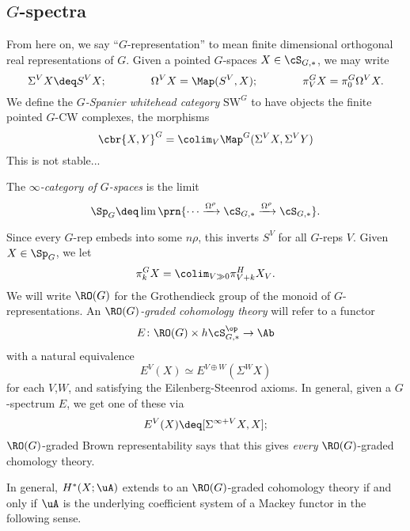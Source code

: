 \subsection{\texorpdfstring{$G$}{G}-spectra}%
\def\SW{\mathrm{SW}}
From here on, we say ``$G$-representation'' to mean finite dimensional orthogonal real representations of $G$.
Given a pointed $G$-spaces $X \in \cS_{G,*}$, we may write
\[
  \Sigma^V X \deq S^V X; \hspace{40pt} \Omega^V X = \Map(S^V,X); \hspace{40pt} \pi_V^G X = \pi_0^G \Omega^V X.
\]
We define the \emph{$G$-Spanier whitehead category} $\SW^G$ to have objects the finite pointed $G$-CW complexes, the morphisms
\[
  \cbr{X,Y}^G = \colim_V \Map^G(\Sigma^V X, \Sigma^V Y)
\]
This is not stable...
\begin{definition}
  The \emph{$\infty$-category of $G$-spaces} is the limit
  \[
    \Sp_G \deq \lim \prn{\cdots \xrightarrow{\Omega^{\rho}} \cS_{G,*} \xrightarrow{\Omega^{\rho}} \cS_{G,*}}.
  \]
\end{definition}
Since every $G$-rep embeds into some $n\rho$, this inverts $S^V$ for all $G$-reps $V$.
Given $X \in \Sp_G$, we let
\[
  \pi_k^G X = \colim_{V \gg 0} \pi_{V +k}^H X_V.
\]
We will write $\RO(G)$ for the Grothendieck group of the monoid of $G$-representations.
An \emph{$\RO(G)$-graded cohomology theory} will refer to a functor
\[
  E\colon  \RO(G) \times h\cS_{G,*}^{\op} \rightarrow \Ab
\]
with a natural equivalence
\[
  E^{V}(X) \simeq E^{V \oplus W}(\Sigma^W X)
\]
for each $V$,$W$, and satisfying the Eilenberg-Steenrod axioms.
In general, given a $G$-spectrum $E$, we get one of these via
\[
  E^V(X) \deq [\Sigma^{\infty + V} X, X];
\]
$\RO(G)$-graded Brown representability says that this gives \emph{every} $\RO(G)$-graded chomology theory.

In general, $H^*(X;\uA)$ extends to an $\RO(G)$-graded cohomology theory if and only if $\uA$ is the underlying coefficient system of a Mackey functor in the following sense.

